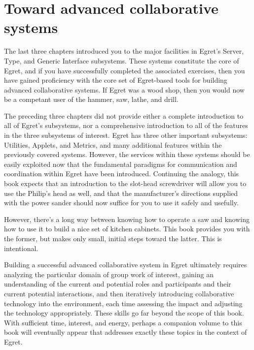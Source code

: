 
\chapter{Toward advanced collaborative systems}

The last three chapters introduced you to the major facilities in Egret's
Server, Type, and Generic Interface subsystems.  These systems constitute
the core of Egret, and if you have successfully completed the associated
exercises, then you have gained proficiency with the core set of
Egret-based tools for building advanced collaborative systems. If
Egret was a wood shop, then you would now be a competant user of
the hammer, saw, lathe, and drill.

The preceding three chapters did not provide either a complete introduction
to all of Egret's subsystems, nor a comprehensive introduction to all of
the features in the three subsystems of interest.  Egret has three other
important subsystems: Utilities, Applets, and Metrics, and many additional
features within the previously covered systems.  However, the services
within these systems should be easily exploited now that the fundamental
paradigms for communication and coordination within Egret have been
introduced.  Continuing the analogy, this book expects that an introduction
to the slot-head screwdriver will allow you to use the Philip's head as
well, and that the manufacturer's directions supplied with the power sander
should now suffice for you to use it safely and usefully.

However, there's a long way between knowing how to operate a saw and
knowing how to use it to build a nice set of kitchen cabinets.  This book
provides you with the former, but makes only small, initial steps toward
the latter.  This is intentional.

Building a successful advanced collaborative system in Egret ultimately
requires analyzing the particular domain of group work of interest, gaining
an understanding of the current and potential roles and participants and
their current potential interactions, and then iteratively introducing
collaborative technology into the environment, each time assessing the
impact and adjusting the technology appropriately.  These skills go
far beyond the scope of this book.  With sufficient time, interest, and
energy, perhaps a companion volume to this book will eventually 
appear that addresses exactly these topics in the context of Egret. 

